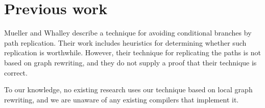 \section{Previous work}

Mueller and Whalley \cite{Mueller:1995:ACB:207110.207116} describe a
technique for avoiding conditional branches by path replication.
Their work includes heuristics for determining whether such
replication is worthwhile.  However, their technique for replicating
the paths is not based on graph rewriting, and they do not supply a
proof that their technique is correct.

To our knowledge, no existing research uses our technique based on
local graph rewriting, and we are unaware of any existing
\commonlisp{} compilers that implement it.
